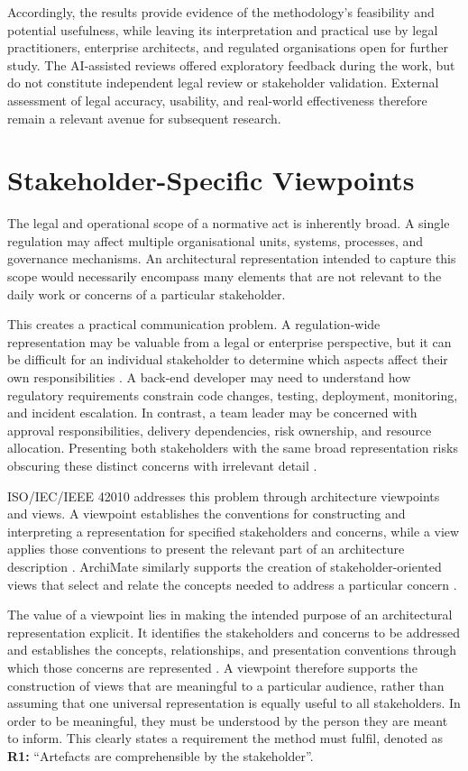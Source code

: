 Accordingly, the results provide evidence of the methodology's feasibility and potential usefulness, while leaving its interpretation and practical use by legal practitioners, enterprise architects, and regulated organisations open for further study. The AI-assisted reviews offered exploratory feedback during the work, but do not constitute independent legal review or stakeholder validation. External assessment of legal accuracy, usability, and real-world effectiveness therefore remain a relevant avenue for subsequent research.

\section{Stakeholder-Specific Viewpoints}

The legal and operational scope of a normative act is inherently broad. A single regulation may affect multiple organisational units, systems, processes, and governance mechanisms. An architectural representation intended to capture this scope would necessarily encompass many elements that are not relevant to the daily work or concerns of a particular stakeholder.

This creates a practical communication problem. A regulation-wide representation may be valuable from a legal or enterprise perspective, but it can be difficult for an individual stakeholder to determine which aspects affect their own responsibilities \cite{KosenkovEtAl2025}. A back-end developer may need to understand how regulatory requirements constrain code changes, testing, deployment, monitoring, and incident escalation. In contrast, a team leader may be concerned with approval responsibilities, delivery dependencies, risk ownership, and resource allocation. Presenting both stakeholders with the same broad representation risks obscuring these distinct concerns with irrelevant detail \cite{BreauxEtAl2008}.

ISO/IEC/IEEE 42010 addresses this problem through architecture viewpoints and views. A viewpoint establishes the conventions for constructing and interpreting a representation for specified stakeholders and concerns, while a view applies those conventions to present the relevant part of an architecture description \cite{ISO42010:2022}. ArchiMate similarly supports the creation of stakeholder-oriented views that select and relate the concepts needed to address a particular concern \cite{opengroup}. 

The value of a viewpoint lies in making the intended purpose of an architectural representation explicit. It identifies the stakeholders and concerns to be addressed and establishes the concepts, relationships, and presentation conventions through which those concerns are represented \cite{ISO42010:2022}. A viewpoint therefore supports the construction of views that are meaningful to a particular audience, rather than assuming that one universal representation is equally useful to all stakeholders. In order to be meaningful, they must be understood by the person they are meant to inform. This clearly states a requirement the method must fulfil, denoted as \textbf{R1:} ``Artefacts are comprehensible by the stakeholder''.

